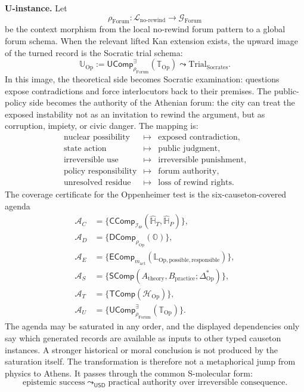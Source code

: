 \documentclass[11pt]{article}
\newcommand{\USD}{\mathsf{USD}}
\newcommand{\defeq}{\mathrel{:=}}
\newcommand{\uconn}{\mathrel{\leadsto_{\USD}}}
\newcommand{\CComp}{\mathsf{CComp}}
\newcommand{\DComp}{\mathsf{DComp}}
\newcommand{\EComp}{\mathsf{EComp}}
\newcommand{\SComp}{\mathsf{SComp}}
\newcommand{\TComp}{\mathsf{TComp}}
\newcommand{\UComp}{\mathsf{UComp}}
\theoremstyle{definition}
\theoremstyle{plain}
\begin{document}
\textbf{U-instance.}  Let
\[
  \rho_{\mathrm{Forum}}:
  \mathcal L_{\mathrm{no\text{-}rewind}}
  \to
  \mathcal G_{\mathrm{Forum}}
\]
be the context morphism from the local no-rewind forum pattern to a
global forum schema.  When the relevant lifted Kan extension exists, the
upward image of the turned record is the Socratic trial schema:
\[
  \mathbb U_{\mathrm{Op}}
  \defeq
  \UComp^{\exists}_{\rho_{\mathrm{Forum}}}(\mathbb T_{\mathrm{Op}})
  \leadsto
  \mathrm{Trial}_{\mathrm{Socrates}}.
\]
In this image, the theoretical side becomes Socratic examination:
questions expose contradictions and force interlocutors back to their
premises.  The public-policy side becomes the authority of the Athenian
forum: the city can treat the exposed instability not as an invitation to
rewind the argument, but as corruption, impiety, or civic danger.  The
mapping is:
\[
\begin{array}{ccl}
  \text{nuclear possibility} &\mapsto& \text{exposed contradiction},\\
  \text{state action} &\mapsto& \text{public judgment},\\
  \text{irreversible use} &\mapsto& \text{irreversible punishment},\\
  \text{policy responsibility} &\mapsto& \text{forum authority},\\
  \text{unresolved residue} &\mapsto& \text{loss of rewind rights}.
\end{array}
\]
The coverage certificate for the Oppenheimer test is the
six-causeton-covered agenda
\[
\begin{aligned}
  \mathcal A_C
  &=
  \{\CComp_{\mathcal I_{\Theta}}
    (\widehat{\mathbb H}_T,\widehat{\mathbb H}_P)\},\\
  \mathcal A_D
  &=
  \{\DComp_{\rho_{\mathrm{Op}}}(\mathbb O)\},\\
  \mathcal A_E
  &=
  \{\EComp_{m_{\mathrm{act}}}
    (\mathbb L_{\mathrm{Op},\mathrm{possible},\mathrm{responsible}})\},\\
  \mathcal A_S
  &=
  \{\SComp(A_{\mathrm{theory}},B_{\mathrm{practice}};
    \Delta_{\mathrm{Op}}^*)\},\\
  \mathcal A_T
  &=
  \{\TComp(\mathcal H_{\mathrm{Op}})\},\\
  \mathcal A_U
  &=
  \{\UComp^{\exists}_{\rho_{\mathrm{Forum}}}
    (\mathbb T_{\mathrm{Op}})\}.
\end{aligned}
\]
The agenda may be saturated in any order, and the displayed dependencies
only say which generated records are available as inputs to other typed
causeton instances.  A stronger historical or moral conclusion is not
produced by the saturation itself.
The transformation is therefore not a metaphorical jump from physics to
Athens.  It passes through the common S-molecular form:
\[
  \text{epistemic success}
  \uconn
  \text{practical authority over irreversible consequence}.
\]
\end{document}

